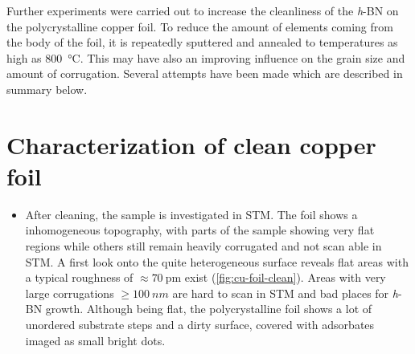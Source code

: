 Further experiments were carried out to increase the cleanliness of the \textit{h}-BN on the polycrystalline copper foil. To reduce the amount of elements coming from the body of the foil, it is repeatedly sputtered and annealed to temperatures as high as \SI{800}{\celsius}. This may have also an improving influence on the grain size and amount of corrugation. Several attempts have been made which are described in summary below.
\section{Characterization of clean copper foil}
\begin{itemize}
 \item After cleaning, the sample is investigated in STM. The foil shows a inhomogeneous topography, with parts of the sample showing very flat regions while others still remain heavily corrugated and not scan able in STM. 
 A first look onto the quite heterogeneous surface reveals flat areas with a typical roughness of $\approx \SI{70}{\pico\meter}$ exist (\autoref{fig:cu-foil-clean}). Areas with very large corrugations $\geq \SI{100}{nm}$ are hard to scan in STM and bad places for \textit{h}-BN growth. Although being flat, the polycrystalline foil shows a lot of unordered substrate steps and a dirty surface, covered with adsorbates imaged as small bright dots.
\end{itemize}

